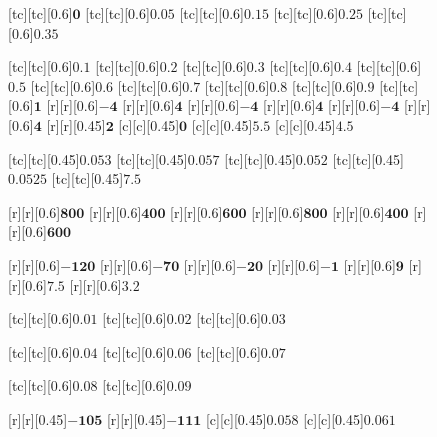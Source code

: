 \documentclass[a4paper, 8pt, twocolumn]{IEEEtran}
\begin{document}
\begin{figure}[htbp]
\def\size{0.6}
\def\sizetwo{0.45}
\centering
{}[tc][tc][\size]{$\bm{0}$}
[tc][tc][\size]{$\bm{0.05}$}
[tc][tc][\size]{$\bm{0.15}$}
[tc][tc][\size]{$\bm{0.25}$}
[tc][tc][\size]{$\bm{0.35}$}

[tc][tc][\size]{$\bm{0.1}$}
[tc][tc][\size]{$\bm{0.2}$}
[tc][tc][\size]{$\bm{0.3}$}
[tc][tc][\size]{$\bm{0.4}$}
[tc][tc][\size]{$\bm{0.5}$}
[tc][tc][\size]{$\bm{0.6}$}
[tc][tc][\size]{$\bm{0.7}$}
[tc][tc][\size]{$\bm{0.8}$}
[tc][tc][\size]{$\bm{0.9}$}
[tc][tc][\size]{$\bm{1}$}
[r][r][\size]{$\bm{-4}$}
[r][r][\size]{$\bm{4}$}
[r][r][\size]{$\bm{-4}$}
[r][r][\size]{$\bm{4}$}
[r][r][\size]{$\bm{-4}$}
[r][r][\size]{$\bm{4}$}
[r][r][\sizetwo]{$\bm{2}$}
[c][c][\sizetwo]{$\bm{0}$}
[c][c][\sizetwo]{$\bm{5.5}$}
[c][c][\sizetwo]{$\bm{4.5}$}

[tc][tc][\sizetwo]{$\bm{0.053}$}
[tc][tc][\sizetwo]{$\bm{0.057}$}
[tc][tc][\sizetwo]{$\bm{0.052}$}
[tc][tc][\sizetwo]{$\bm{0.0525}$}
[tc][tc][\sizetwo]{$\bm{7.5}$}

[r][r][\size]{$\bm{800}$}
[r][r][\size]{$\bm{400}$}
[r][r][\size]{$\bm{600}$}
[r][r][\size]{$\bm{800}$}
[r][r][\size]{$\bm{400}$}
[r][r][\size]{$\bm{600}$}


[r][r][\size]{$\bm{-120}$}
[r][r][\size]{$\bm{-70}$}
[r][r][\size]{$\bm{-20}$}
[r][r][\size]{$\bm{-1}$}
[r][r][\size]{$\bm{9}$}
[r][r][\size]{$\bm{7.5}$}
[r][r][\size]{$\bm{3.2}$}

[tc][tc][\size]{$\bm{0.01}$}
[tc][tc][\size]{$\bm{0.02}$}
[tc][tc][\size]{$\bm{0.03}$}

[tc][tc][\size]{$\bm{0.04}$}
[tc][tc][\size]{$\bm{0.06}$}
[tc][tc][\size]{$\bm{0.07}$}

[tc][tc][\size]{$\bm{0.08}$}
[tc][tc][\size]{$\bm{0.09}$}


[r][r][\sizetwo]{$\bm{-105}$}
[r][r][\sizetwo]{$\bm{-111}$}
[c][c][\sizetwo]{$\bm{0.058}$}
[c][c][\sizetwo]{$\bm{0.061}$}


\end{figure}
\end{document}
